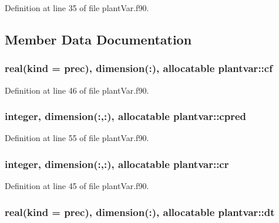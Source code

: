 Definition at line 35 of file plant\-Var.\-f90.



\subsection{Member Data Documentation}
\hypertarget{classplantvar_af0df4533997b17a1fd69f0c152ce2804}{
\subsubsection[{cf}]{\setlength{\rightskip}{0pt plus 5cm}real(kind = prec), dimension(\-:), allocatable plantvar\-::cf}}\label{classplantvar_af0df4533997b17a1fd69f0c152ce2804}


Definition at line 46 of file plant\-Var.\-f90.

\hypertarget{classplantvar_ae294a125343fb4fbe36e5a830ec9be5d}{
\subsubsection[{cpred}]{\setlength{\rightskip}{0pt plus 5cm}integer, dimension(\-:,\-:), allocatable plantvar\-::cpred}}\label{classplantvar_ae294a125343fb4fbe36e5a830ec9be5d}


Definition at line 55 of file plant\-Var.\-f90.

\hypertarget{classplantvar_a01620e31bb05f1443908f0bff75215a4}{
\subsubsection[{cr}]{\setlength{\rightskip}{0pt plus 5cm}integer, dimension(\-:,\-:), allocatable plantvar\-::cr}}\label{classplantvar_a01620e31bb05f1443908f0bff75215a4}


Definition at line 45 of file plant\-Var.\-f90.

\hypertarget{classplantvar_ae10871bcf2f4379bd15a518a314038de}{
\subsubsection[{dt}]{\setlength{\rightskip}{0pt plus 5cm}real(kind = prec), dimension(\-:), allocatable plantvar\-::dt}}\label{classplantvar_ae10871bcf2f4379bd15a518a314038de}


